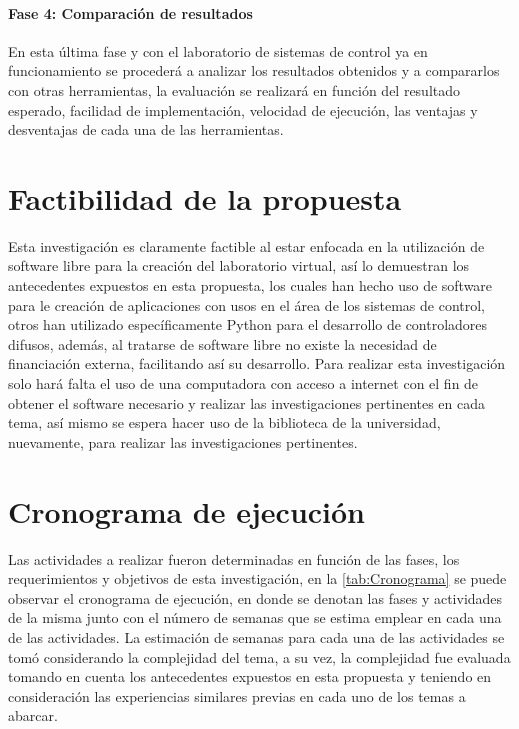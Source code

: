 	\paragraph{Fase 4: Comparación de resultados}
		
		En esta última fase y con el laboratorio de sistemas de control ya en funcionamiento se procederá a analizar los resultados obtenidos y a compararlos con otras herramientas, la evaluación se realizará en función del resultado esperado, facilidad de implementación, velocidad de ejecución, las ventajas y desventajas de cada una de las herramientas.

\section{Factibilidad de la propuesta}

	Esta investigación es claramente factible al estar enfocada en la utilización de software libre para la creación del laboratorio virtual, así lo demuestran los antecedentes expuestos en esta propuesta, los cuales han hecho uso de software para le creación de aplicaciones con usos en el área de los sistemas de control, otros han utilizado específicamente Python para el desarrollo de controladores difusos, además, al tratarse de software libre no existe la necesidad de financiación externa, facilitando así su desarrollo. Para realizar esta investigación solo hará falta el uso de una computadora con acceso a internet con el fin de obtener el software necesario y realizar las investigaciones pertinentes en cada tema, así mismo se espera hacer uso de la biblioteca de la universidad, nuevamente, para realizar las investigaciones pertinentes.
	
\section{Cronograma de ejecución}

	Las actividades a realizar fueron determinadas en función de las fases, los requerimientos y objetivos de esta investigación, en la \cref{tab:Cronograma} se puede observar el cronograma de ejecución, en donde se denotan las fases y actividades de la misma junto con el número de semanas que se estima emplear en cada una de las actividades. La estimación de semanas para cada una de las actividades se tomó considerando la complejidad del tema, a su vez, la complejidad fue evaluada tomando en cuenta los antecedentes expuestos en esta propuesta y teniendo en consideración las experiencias similares previas en cada uno de los temas a abarcar.

